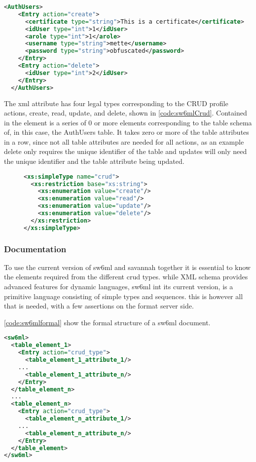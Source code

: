 \begin{Code}
\begin{lstlisting}[label=code:sw6mlExample01,language=XML,caption=Example of sw6ml syntax]
 <AuthUsers>
    <Entry action="create">
      <certificate type="string">This is a certificate</certificate>
      <idUser type="int">1</idUser>
      <arole type="int">1</arole>
      <username type="string">mette</username>
      <password type="string">obfuscated</password>
    </Entry>
    <Entry action="delete">
      <idUser type="int">2</idUser>
    </Entry>
  </AuthUsers>
\end{lstlisting}
\end{Code}
The  xml attribute has four legal types corresponding to the CRUD profile actions, create, read, update, and delete, shown in \autoref{code:sw6mlCrud}.
Contained in the   element is a series of 0 or more elements corresponding to the table schema of, in this case, the AuthUsers table.
It takes zero or more of the table attributes in a row, since not all table attributes are needed for all actions, as an example delete only requires the unique identifier of the table and
updates will only need the unique identifier and the table attribute being updated.
\begin{figure}[H]
\begin{lstlisting}[label=code:sw6mlCrud,language=XML,caption=sw6ml crud simple type]
 <xs:simpleType name="crud">
  <xs:restriction base="xs:string">
    <xs:enumeration value="create"/>
    <xs:enumeration value="read"/>
    <xs:enumeration value="update"/>
    <xs:enumeration value="delete"/>
  </xs:restriction>
</xs:simpleType>
\end{lstlisting}
\end{figure}

\subsubsection{Documentation}
\label{sw6mlusage}
To use the current version of sw6ml and savannah together it is essential to know the elements required from the different crud types.
while XML schema provides advanced features for dynamic languages, sw6ml int its current version, is a primitive language consisting of simple types and sequences.
this is however all that is needed, with a few assertions on the format server side.

\autoref{code:sw6mlformal} show the formal structure of a sw6ml document.
\begin{Code}
\begin{lstlisting}[label=code:sw6mlformal,language=XML,caption=root and table elements]
<sw6ml> 
  <table_element_1>
    <Entry action="crud_type">
      <table_element_1_attribute_1/>
	...
      <table_element_1_attribute_n/>
    </Entry>
  </table_element_n>
  ...
  <table_element_n>
    <Entry action="crud_type">
      <table_element_n_attribute_1/>
	...
      <table_element_n_attribute_n/>
    </Entry>
  </table_element>
</sw6ml>
\end{lstlisting}
\end{Code}

